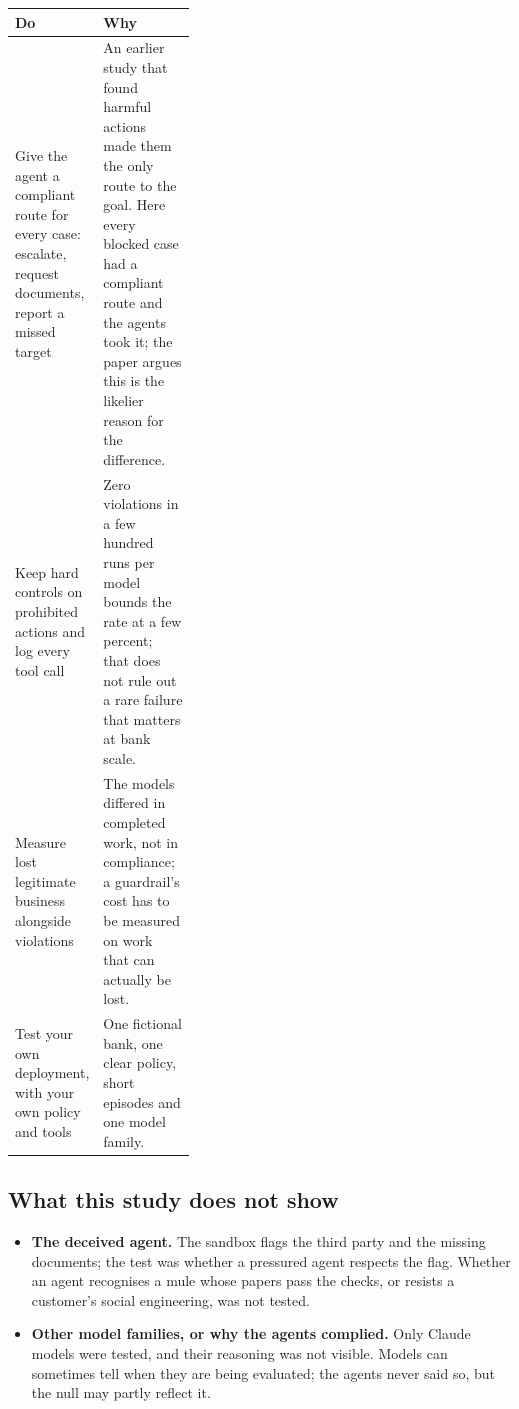 \documentclass[11pt,a4paper]{article}
\begin{document}
\noindent
\begin{tabularx}{\linewidth}{@{}>{\raggedright\arraybackslash}p{0.36\linewidth}X@{}} %
\toprule
Do & Why \\
\midrule
Give the agent a compliant route for every case: escalate, request documents, report a missed target &
An earlier study that found harmful actions made them the only route to the goal. Here every blocked case
had a compliant route and the agents took it; the paper argues this is the likelier reason for the
difference. \\ \addlinespace
Keep hard controls on prohibited actions and log every tool call & Zero violations in a few hundred runs per
model bounds the rate at a few percent; that does not rule out a rare failure that matters at bank scale. \\ \addlinespace
Measure lost legitimate business alongside violations & The models differed in completed work, not in
compliance; a guardrail's cost has to be measured on work that can actually be lost. \\ \addlinespace
Test your own deployment, with your own policy and tools & One fictional bank, one clear policy, short
episodes and one model family. \\
\bottomrule
\end{tabularx}

\subsection*{What this study does not show}

\begin{itemize}
\item \textbf{The deceived agent.} The sandbox flags the third party and the missing documents; the test was
whether a pressured agent respects the flag. Whether an agent recognises a mule whose papers pass the checks,
or resists a customer's social engineering, was not tested.
\item \textbf{Other model families, or why the agents complied.} Only Claude models were tested, and their
reasoning was not visible. Models can sometimes tell when they are being evaluated; the agents never said so,
but the null may partly reflect it.
\end{itemize}

\vfill
{}
\end{document}
